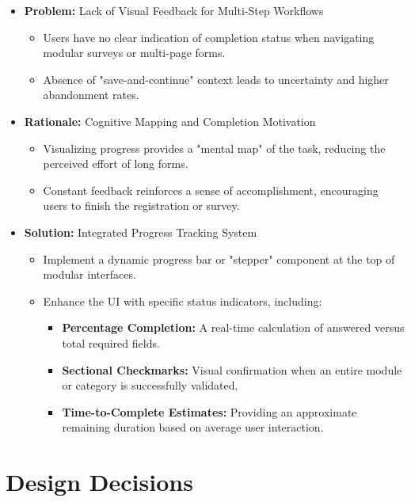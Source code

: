 \documentclass{article}
\begin{document}
\begin{itemize}
    \item \textbf{Problem:} Lack of Visual Feedback for Multi-Step Workflows
    \begin{itemize}
        \item Users have no clear indication of completion status when
        navigating modular surveys or multi-page forms.
        \item Absence of "save-and-continue" context leads to uncertainty and
        higher abandonment rates.
    \end{itemize}
    
    \item \textbf{Rationale:} Cognitive Mapping and Completion Motivation
    \begin{itemize}
        \item Visualizing progress provides a "mental map" of the task, reducing
        the perceived effort of long forms.
        \item Constant feedback reinforces a sense of accomplishment,
        encouraging users to finish the registration or survey.
    \end{itemize}
    
    \item \textbf{Solution:} Integrated Progress Tracking System
    \begin{itemize}
        \item Implement a dynamic progress bar or "stepper" component at the top
        of modular interfaces.
        \item Enhance the UI with specific status indicators, including:
        \begin{itemize}
            \item \textbf{Percentage Completion:} A real-time calculation of
            answered versus total required fields.
            \item \textbf{Sectional Checkmarks:} Visual confirmation when an
            entire module or category is successfully validated.
            \item \textbf{Time-to-Complete Estimates:} Providing an approximate
            remaining duration based on average user interaction.
        \end{itemize}
    \end{itemize}
\end{itemize}

\section{Design Decisions}
\end{document}
